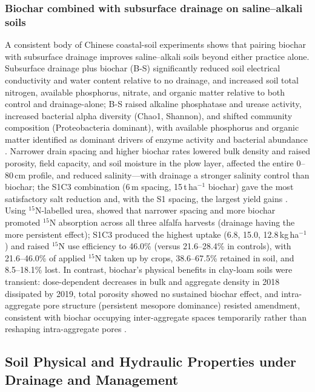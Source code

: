 \documentclass[11pt]{article}
\begin{document}
\subsubsection{Biochar combined with subsurface drainage on saline--alkali soils}
A consistent body of Chinese coastal-soil experiments shows that pairing biochar with subsurface drainage improves saline--alkali soils beyond either practice alone. Subsurface drainage plus biochar (B-S) significantly reduced soil electrical conductivity and water content relative to no drainage, and increased soil total nitrogen, available phosphorus, nitrate, and organic matter relative to both control and drainage-alone; B-S raised alkaline phosphatase and urease activity, increased bacterial alpha diversity (Chao1, Shannon), and shifted community composition (Proteobacteria dominant), with available phosphorus and organic matter identified as dominant drivers of enzyme activity and bacterial abundance \parencite{Tian2023b}. Narrower drain spacing and higher biochar rates lowered bulk density and raised porosity, field capacity, and soil moisture in the plow layer, affected the entire 0--80\,cm profile, and reduced salinity---with drainage a stronger salinity control than biochar; the S1C3 combination (6\,m spacing, 15\,t\,ha$^{-1}$ biochar) gave the most satisfactory salt reduction and, with the S1 spacing, the largest yield gains \parencite{Liu2025f}. Using $^{15}$N-labelled urea, \textcite{Xiong2025} showed that narrower spacing and more biochar promoted $^{15}$N absorption across all three alfalfa harvests (drainage having the more persistent effect); S1C3 produced the highest uptake (6.8, 15.0, 12.8\,kg\,ha$^{-1}$) and raised $^{15}$N use efficiency to 46.0\% (versus 21.6--28.4\% in controls), with 21.6--46.0\% of applied $^{15}$N taken up by crops, 38.6--67.5\% retained in soil, and 8.5--18.1\% lost. In contrast, biochar's physical benefits in clay-loam soils were transient: dose-dependent decreases in bulk and aggregate density in 2018 dissipated by 2019, total porosity showed no sustained biochar effect, and intra-aggregate pore structure (persistent mesopore dominance) resisted amendment, consistent with biochar occupying inter-aggregate spaces temporarily rather than reshaping intra-aggregate pores \parencite{Brikmans2025}.

\subsection{Soil Physical and Hydraulic Properties under Drainage and Management}
\end{document}
